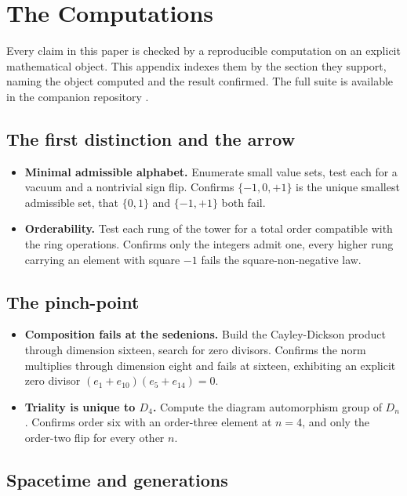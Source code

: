 \section{The Computations} \label{app:computations}

Every claim in this paper is checked by a reproducible computation on an explicit mathematical object. This appendix
indexes them by the section they support, naming the object computed and the result confirmed. The full suite is
available in the companion repository \cite{cluesurf2026repo}.

\subsection*{The first distinction and the arrow}

\begin{itemize}
  \item \textbf{Minimal admissible alphabet.} Enumerate small value sets, test each for a vacuum and a nontrivial sign
  flip. Confirms $\{-1,0,+1\}$ is the unique smallest admissible set, that $\{0,1\}$ and $\{-1,+1\}$ both fail.
  \item \textbf{Orderability.} Test each rung of the tower for a total order compatible with the ring operations.
  Confirms only the integers admit one, every higher rung carrying an element with square $-1$ fails the
  square-non-negative law.
\end{itemize}

\subsection*{The pinch-point}

\begin{itemize}
  \item \textbf{Composition fails at the sedenions.} Build the Cayley-Dickson product through dimension sixteen, search
  for zero divisors. Confirms the norm multiplies through dimension eight and fails at sixteen, exhibiting an explicit
  zero divisor $(e_1 + e_{10})(e_5 + e_{14}) = 0$.
  \item \textbf{Triality is unique to $D_4$.} Compute the diagram automorphism group of $D_n$. Confirms order six with
  an order-three element at $n = 4$, and only the order-two flip for every other $n$.
\end{itemize}

\subsection*{Spacetime and generations}

